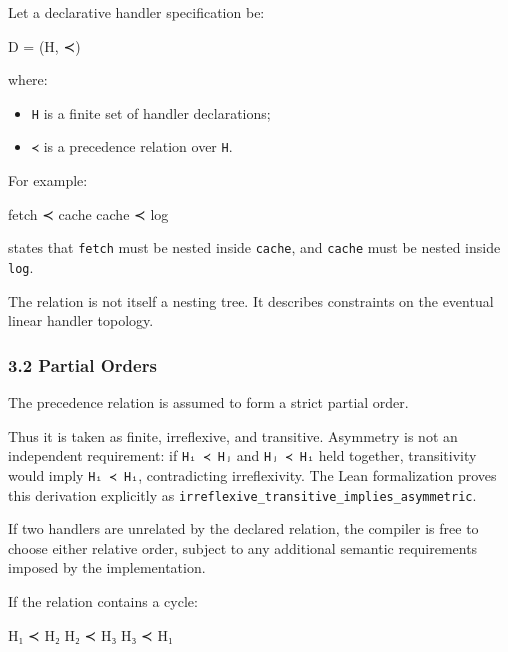 \documentclass[
  11pt,
]{article}
\newenvironment{Shaded}{}{}
\newcommand{\NormalTok}[1]{#1}
\providecommand{\tightlist}{%
  \setlength{\itemsep}{0pt}\setlength{\parskip}{0pt}}
\begin{document}
Let a declarative handler specification be:

\begin{Shaded}
\begin{Highlighting}[]
\NormalTok{D = (H, ≺)}
\end{Highlighting}
\end{Shaded}

where:

\begin{itemize}
\tightlist
\item
  \texttt{H} is a finite set of handler declarations;
\item
  \texttt{≺} is a precedence relation over \texttt{H}.
\end{itemize}

For example:

\begin{Shaded}
\begin{Highlighting}[]
\NormalTok{fetch ≺ cache}
\NormalTok{cache ≺ log}
\end{Highlighting}
\end{Shaded}

states that \texttt{fetch} must be nested inside \texttt{cache}, and
\texttt{cache} must be nested inside \texttt{log}.

The relation is not itself a nesting tree. It describes constraints on
the eventual linear handler topology.

\subsubsection{3.2 Partial Orders}\label{partial-orders}

The precedence relation is assumed to form a strict partial order.

Thus it is taken as finite, irreflexive, and transitive. Asymmetry is
not an independent requirement: if \texttt{Hᵢ\ ≺\ Hⱼ} and
\texttt{Hⱼ\ ≺\ Hᵢ} held together, transitivity would imply
\texttt{Hᵢ\ ≺\ Hᵢ}, contradicting irreflexivity. The Lean formalization
proves this derivation explicitly as
\texttt{irreflexive\_transitive\_implies\_asymmetric}.

If two handlers are unrelated by the declared relation, the compiler is
free to choose either relative order, subject to any additional semantic
requirements imposed by the implementation.

If the relation contains a cycle:

\begin{Shaded}
\begin{Highlighting}[]
\NormalTok{H₁ ≺ H₂}
\NormalTok{H₂ ≺ H₃}
\NormalTok{H₃ ≺ H₁}
\end{Highlighting}
\end{Shaded}
\end{document}
